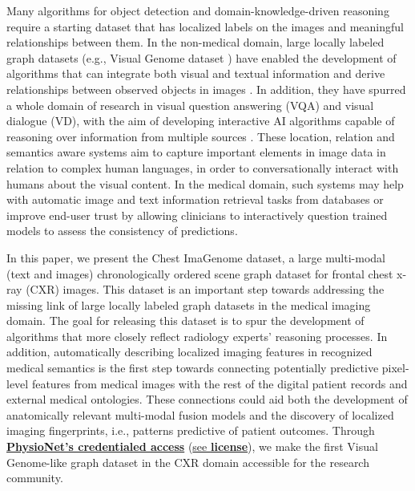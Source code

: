 
Many algorithms for object detection and domain-knowledge-driven reasoning require a starting dataset that has localized labels on the images and meaningful relationships between them. In the non-medical domain, large locally labeled graph datasets (e.g., Visual Genome dataset \cite{krishna2017visual}) have enabled the development of algorithms that can integrate both visual and textual information and derive relationships between observed objects in images \cite{xu2017scene,li2017scene,yang2018graph}. In addition, they have spurred a whole domain of research in visual question answering (VQA) and visual dialogue (VD), with the aim of developing interactive AI algorithms capable of reasoning over information from multiple sources \cite{antol2015vqa,das2017visual,de2017guesswhat}. These location, relation and semantics aware systems aim to capture important elements in image data in relation to complex human languages, in order to conversationally interact with humans about the visual content. In the medical domain, such systems may help with automatic image and text information retrieval tasks from databases or improve end-user trust by allowing clinicians to interactively question trained models to assess the consistency of predictions.

In this paper, we present the Chest ImaGenome dataset, a large multi-modal (text and images) chronologically ordered scene graph dataset for frontal chest x-ray (CXR) images. This dataset is an important step towards addressing the missing link of large locally labeled graph datasets in the medical imaging domain. The goal for releasing this dataset is to spur the development of algorithms that more closely reflect radiology experts’ reasoning processes. In addition, automatically describing localized imaging features in recognized medical semantics is the first step towards connecting potentially predictive pixel-level features from medical images with the rest of the digital patient records and external medical ontologies. These connections could aid both the development of anatomically relevant multi-modal fusion models and the discovery of localized imaging fingerprints, i.e., patterns predictive of patient outcomes. Through  \href{https://doi.org/10.13026/wv01-y230}{\textbf{PhysioNet's credentialed access}} (\href{https://physionet.org/content/chest-imagenome/view-license/1.0.0/}{see \textbf{license}}), we make the first Visual Genome-like graph dataset in the CXR domain accessible for the research community.

